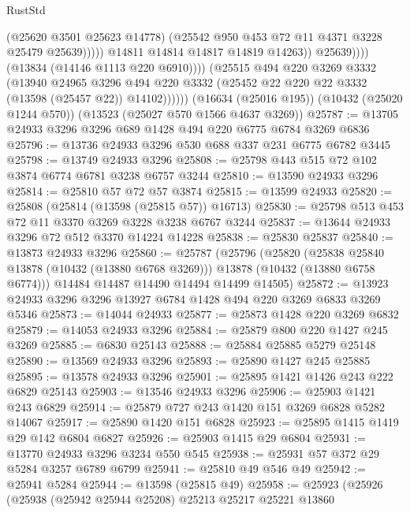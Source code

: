 \begin{lexlean}{RustStd}
\begin{coremodule}
                                  (@25620 @3501 @25623 @14778)
                                  (@25542 @950 @453 @72 @11 @4371 @3228 @25479 @25639)))))
                          @14811
                          @14814
                          @14817
                          @14819
                          @14263))
                      @25639))))
              (@13834 (@14146 @1113 @220 @6910))))
          (@25515
            @494
            @220
            @3269
            @3332
            (@13940
              @24965
              @3296
              @494
              @220
              @3332
              (@25452 @22 @220 @22 @3332 (@13598 (@25457 @22)) @14102))))))
    (@16634 (@25016 @195))
    (@10432 (@25020 @1244 @570))
    (@13523 (@25027 @570 @1566 @4637 @3269))
@25787 := @13705 @24933 @3296 @3296 @689 @1428 @494 @220 @6775 @6784 @3269 @6836
@25796 := @13736 @24933 @3296 @530 @688 @337 @231 @6775 @6782 @3445
@25798 := @13749 @24933 @3296
@25808 := @25798 @443 @515 @72 @102 @3874 @6774 @6781 @3238 @6757 @3244
@25810 := @13590 @24933 @3296
@25814 := @25810 @57 @72 @57 @3874
@25815 := @13599 @24933
@25820 := @25808 (@25814 (@13598 (@25815 @57)) @16713)
@25830 := @25798 @513 @453 @72 @11 @3370 @3269 @3228 @3238 @6767 @3244
@25837 := @13644 @24933 @3296 @72 @512 @3370 @14224 @14228
@25838 := @25830 @25837
@25840 := @13873 @24933 @3296
@25860 := @25787
    (@25796
      (@25820
        (@25838 @25840 @13878 (@10432 (@13880 @6768 @3269)))
        @13878
        (@10432 (@13880 @6758 @6774)))
      @14484
      @14487
      @14490
      @14494
      @14499
      @14505)
@25872 := @13923 @24933 @3296 @3296 @13927 @6784 @1428 @494 @220 @3269 @6833 @3269 @5346
@25873 := @14044 @24933
@25877 := @25873 @1428 @220 @3269 @6832
@25879 := @14053 @24933 @3296
@25884 := @25879 @800 @220 @1427 @245 @3269
@25885 := @6830 @25143
@25888 := @25884 @25885 @5279 @25148
@25890 := @13569 @24933 @3296
@25893 := @25890 @1427 @245 @25885
@25895 := @13578 @24933 @3296
@25901 := @25895 @1421 @1426 @243 @222 @6829 @25143
@25903 := @13546 @24933 @3296
@25906 := @25903 @1421 @243 @6829
@25914 := @25879 @727 @243 @1420 @151 @3269 @6828 @5282 @14067
@25917 := @25890 @1420 @151 @6828
@25923 := @25895 @1415 @1419 @29 @142 @6804 @6827
@25926 := @25903 @1415 @29 @6804
@25931 := @13770 @24933 @3296 @3234 @550 @545
@25938 := @25931 @57 @372 @29 @5284 @3257 @6789 @6799
@25941 := @25810 @49 @546 @49
@25942 := @25941 @5284
@25944 := @13598 (@25815 @49)
@25958 := @25923
    (@25926
      (@25938
        (@25942 @25944 @25208)
        @25213
        @25217
        @25221
        @13860

\end{coremodule}
\end{lexlean}
